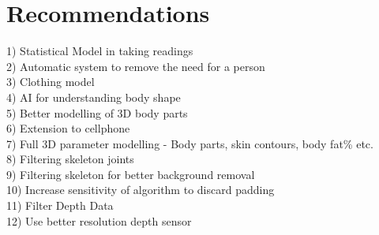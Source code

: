 \chapter{Recommendations}

1) Statistical Model in taking readings\\
2) Automatic system to remove the need for a person\\
3) Clothing model\\
4) AI for understanding body shape\\
5) Better modelling of 3D body parts\\
6) Extension to cellphone\\
7) Full 3D parameter modelling - Body parts, skin contours, body fat\% etc.\\
8) Filtering skeleton joints\\
9) Filtering skeleton for better background removal\\
10) Increase sensitivity of algorithm to discard padding\\
11) Filter Depth Data\\
12) Use better resolution depth sensor\\
